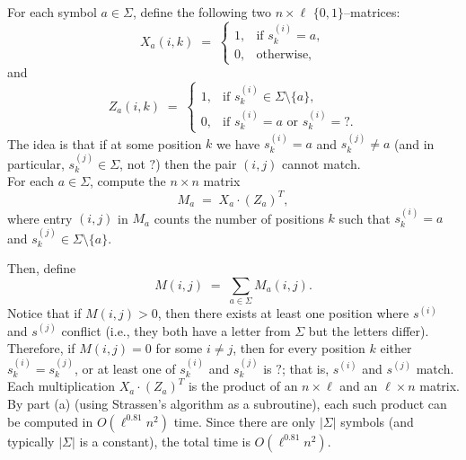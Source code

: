 \documentclass[11pt]{article}
\begin{document}
\begin{description}
\medskip
{}\\
\newcommand{\DC}{\texttt{?}}
For each symbol $a\in \Sigma$, define the following two $n\times\ell$ $\{0,1\}$--matrices:
\[
X_a(i,k) \;=\; \begin{cases}
1, & \text{if } s_k^{(i)}=a,\\[1mm]
0, & \text{otherwise},
\end{cases}
\]
and
\[
Z_a(i,k) \;=\; \begin{cases}
1, & \text{if } s_k^{(i)}\in\Sigma\setminus\{a\},\\[1mm]
0, & \text{if } s_k^{(i)}=a \text{ or } s_k^{(i)}=\DC.
\end{cases}
\]
The idea is that if at some position $k$ we have $s_k^{(i)}=a$ and $s_k^{(j)}\neq a$ (and in particular, $s_k^{(j)}\in\Sigma$, not $\DC$) then the pair $(i,j)$ cannot match.\\
For each $a\in\Sigma$, compute the $n\times n$ matrix
\[
M_a \;=\; X_a \cdot (Z_a)^T,
\]
where entry $(i,j)$ in $M_a$ counts the number of positions $k$ such that $s_k^{(i)}=a$ and $s_k^{(j)}\in\Sigma\setminus\{a\}$.

Then, define
\[
M(i,j) \;=\; \sum_{a\in\Sigma} M_a(i,j).
\]
Notice that if $M(i,j)>0$, then there exists at least one position where $s^{(i)}$ and $s^{(j)}$ conflict (i.e., they both have a letter from $\Sigma$ but the letters differ). Therefore, if $M(i,j)=0$ for some $i\neq j$, then for every position $k$ either $s_k^{(i)}=s_k^{(j)}$, or at least one of $s_k^{(i)}$ and $s_k^{(j)}$ is $\DC$; that is, $s^{(i)}$ and $s^{(j)}$ match.\\
Each multiplication $X_a\cdot (Z_a)^T$ is the product of an $n\times\ell$ and an $\ell\times n$ matrix. By part (a) (using Strassen's algorithm as a subroutine), each such product can be computed in $O(\ell^{0.81}n^2)$ time. Since there are only $|\Sigma|$ symbols (and typically $|\Sigma|$ is a constant), the total time is $O(\ell^{0.81}n^2)$.



\end{description}
\end{document}
